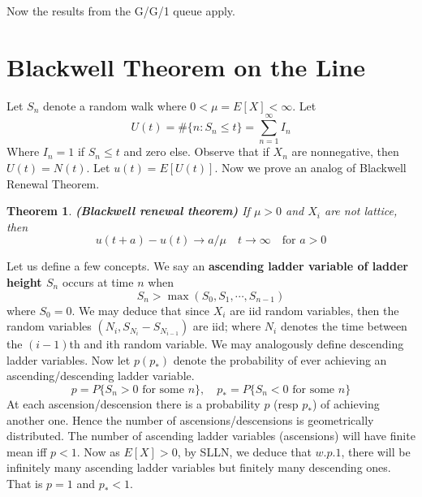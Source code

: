 \documentclass[a4paper,10pt]{article}
\theoremstyle{plain}
\newtheorem{thm}{Theorem}[section]
\theoremstyle{definition}
\theoremstyle{remark}
\begin{document}
Now the results from the G/G/1 queue apply.

\section{Blackwell Theorem on the Line}
Let $S_n$ denote a random walk where $0<\mu=E[X] < \infty$. Let 
\[U(t)=\#\{n: S_n \leq t\} = \sum_{n=1}^\infty I_n\]
Where $I_n=1$ if $S_n \leq t$ and zero else. Observe that if $X_n$ are nonnegative, then $U(t) = N(t)$. Let $u(t) = E[U(t)]$. Now we prove an analog of Blackwell Renewal Theorem. 

\begin{thm}
\textbf{(Blackwell renewal theorem)} If $\mu > 0$ and $X_i$ are not lattice, then
\[u(t+a) - u(t) \to a/\mu \quad t\to \infty \quad \mbox{for }a>0\]
\end{thm}
Let us define a few concepts. We say an \textbf{ascending ladder variable of ladder height $S_n$} occurs at time $n$ when
\[S_n > \max(S_0,S_1,\cdots, S_{n-1})\]
where $S_0 = 0$. We may deduce that since $X_i$ are iid random variables, then the random variables $(N_i,S_{N_i}-S_{N_{i-1}})$ are iid; where $N_i$ denotes the time between the $(i-1)$th and ith random variable. We may analogously define descending ladder variables. Now let $p(p_*)$ denote the probability of ever achieving an ascending/descending ladder variable.
\[p = P\{S_n > 0 \mbox{ for some }n\},\quad p_* = P\{S_n < 0 \mbox{ for some }n\}\]
At each ascension/descension there is a probability $p$ (resp $p_*$) of achieving another one. Hence the number of ascensions/descensions is geometrically distributed. The number of ascending ladder variables (ascensions) will have finite mean iff $p < 1$. Now as $E[X] > 0$, by SLLN, we deduce that $w.p.1$, there will be infinitely many ascending ladder variables but finitely many descending ones. That is $p =1$ and $p_* < 1$.
\end{document}
